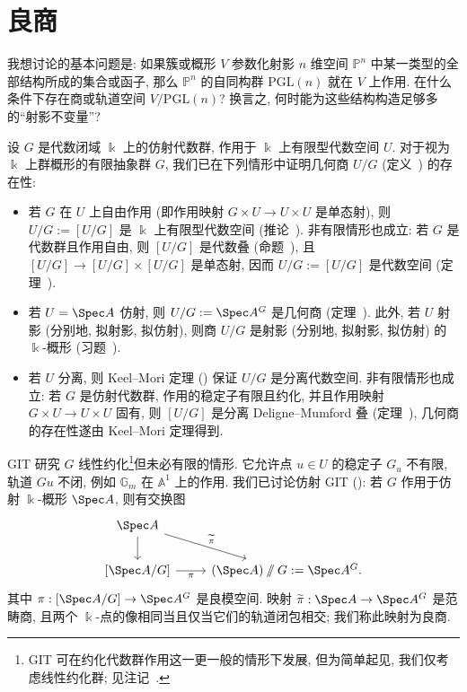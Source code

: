 \section{良商}\label{src:8.1}
\begin{epigraph}
我想讨论的基本问题是: 如果簇或概形 $V$ 参数化射影 $n$ 维空间 $\mathbb P^n$ 中某一类型的全部结构所成的集合或函子, 那么 $\mathbb P^n$ 的自同构群 $\mathrm{PGL}(n)$ 就在 $V$ 上作用. 在什么条件下存在商或轨道空间 $V/\mathrm{PGL}(n)$? 换言之, 何时能为这些结构构造足够多的``射影不变量''?
\end{epigraph}
设 $G$ 是代数闭域 $\Bbbk$ 上的仿射代数群, 作用于 $\Bbbk$ 上有限型代数空间 $U$. 对于视为 $\Bbbk$ 上群概形的有限抽象群 $G$, 我们已在下列情形中证明几何商 $U/G$ (定义~) 的存在性:
\begin{itemize}
\item 若 $G$ 在 $U$ 上自由作用 (即作用映射 $G\times U\to U\times U$ 是单态射), 则 $U/G:=[U/G]$ 是 $\Bbbk$ 上有限型代数空间 (推论~). 非有限情形也成立: 若 $G$ 是代数群且作用自由, 则 $[U/G]$ 是代数叠 (命题~), 且 $[U/G]\to[U/G]\times[U/G]$ 是单态射, 因而 $U/G:=[U/G]$ 是代数空间 (定理~).
\item 若 $U=\Spec A$ 仿射, 则 $U/G:=\Spec A^G$ 是几何商 (定理~). 此外, 若 $U$ 射影 (分别地, 拟射影, 拟仿射), 则商 $U/G$ 是射影 (分别地, 拟射影, 拟仿射) 的 $\Bbbk$-概形 (习题~).
\item 若 $U$ 分离, 则 Keel--Mori 定理 () 保证 $U/G$ 是分离代数空间. 非有限情形也成立: 若 $G$ 是仿射代数群, 作用的稳定子有限且约化, 并且作用映射 $G\times U\to U\times U$ 固有, 则 $[U/G]$ 是分离 Deligne--Mumford 叠 (定理~), 几何商的存在性遂由 Keel--Mori 定理得到.
\end{itemize}
GIT 研究 $G$ 线性约化\footnote{GIT 可在约化代数群作用这一更一般的情形下发展, 但为简单起见, 我们仅考虑线性约化群; 见注记~.}但未必有限的情形. 它允许点 $u\in U$ 的稳定子 $G_u$ 不有限, 轨道 $Gu$ 不闭, 例如 $\mathbb G_m$ 在 $\mathbb A^1$ 上的作用. 我们已讨论仿射 GIT (): 若 $G$ 作用于仿射 $\Bbbk$-概形 $\Spec A$, 则有交换图
\[
\begin{tikzcd}[ampersand replacement=\&]
\Spec A\arrow[d]\arrow[dr,"\widetilde\pi"]\&{}\\
{[\Spec A/G]}\arrow[r,"\pi"']\&{(\Spec A)\sslash G:=\Spec A^G}.
\end{tikzcd}
\]
其中 $\pi:[\Spec A/G]\to\Spec A^G$ 是良模空间. 映射 $\widetilde\pi:\Spec A\to\Spec A^G$ 是范畴商, 且两个 $\Bbbk$-点的像相同当且仅当它们的轨道闭包相交; 我们称此映射为良商.
